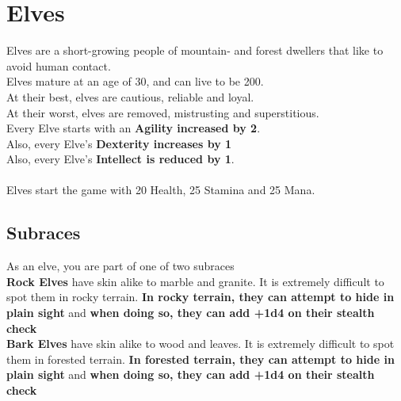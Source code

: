 \section{Elves}\label{race:elves}
Elves are a short-growing people of mountain- and forest dwellers that like to avoid human contact.\\
Elves mature at an age of 30, and can live to be 200.\\
At their best, elves are cautious, reliable and loyal.\\
At their worst, elves are removed, mistrusting and superstitious.\\
Every Elve starts with an \textbf{Agility increased by 2}.\\
Also, every Elve's \textbf{Dexterity increases by 1}\\
Also, every Elve's \textbf{Intellect is reduced by 1}.\\\\
Elves start the game with 20 Health, 25 Stamina and 25 Mana.\\


\subsection{Subraces}
As an elve, you are part of one of two subraces\\

\textbf{Rock Elves} have skin alike to marble and granite.
It is extremely difficult to spot them in rocky terrain.
\textbf{In rocky terrain, they can attempt to hide in plain sight} and \textbf{when doing so, they can add +1d4 on their stealth check}\\

\textbf{Bark Elves} have skin alike to wood and leaves.
It is extremely difficult to spot them in forested terrain.
\textbf{In forested terrain, they can attempt to hide in plain sight} and \textbf{when doing so, they can add +1d4 on their stealth check}